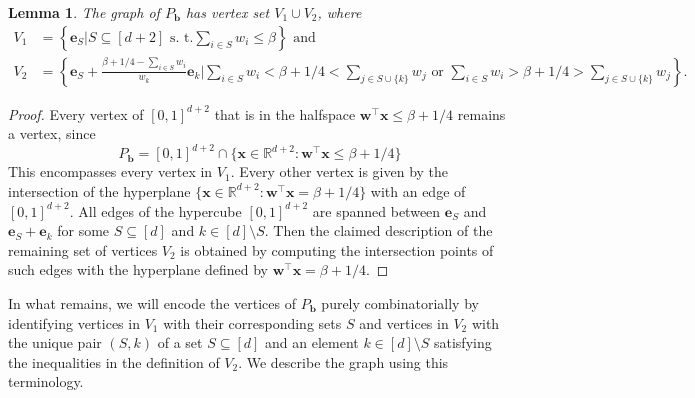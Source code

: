 \documentclass[centering,11pt,reqno]{amsart}
\newtheorem{lem}[theorem]{Lemma}
\theoremstyle{definition}
\begin{document}
\begin{lem}
\label{lem:knapsackvertices}
The graph of $P_{\mathbf{b}}$ has vertex set $V_{1} \cup V_{2}$, where 
\begin{align*}
    V_{1} &= \left\{\mathbf{e}_S\bigg\vert S\subseteq [d+2] \text{ s. t.} \sum_{i \in S} w_{i} \leq \beta\right\} \text{ and} \\
    V_{2} &= \left\{\mathbf{e}_{S} + \frac{\beta+1/4-\sum_{i\in S} w_{i}}{w_{k}} \mathbf{e}_{k}\bigg\vert \sum_{i \in S} w_{i} < \beta + 1/4< \sum_{j \in S \cup \{k\}} w_{j} \text{ or }\sum_{i \in S} w_{i} > \beta + 1/4 > \sum_{j \in S \cup \{k\}} w_{j}\right\}.
\end{align*}
\end{lem}

\begin{proof}
Every vertex of $[0,1]^{d+2}$ that is in the halfspace $\mathbf{w}^{\intercal} \mathbf{x} \leq \beta + 1/4$ remains a vertex, since 
\[P_{\mathbf{b}} = [0,1]^{d+2} \cap  \{\mathbf{x} \in \mathbb{R}^{d+2}: \mathbf{w}^{\intercal} \mathbf{x} \leq \beta + 1/4\}\]
This encompasses every vertex in $V_{1}$. Every other vertex is given by the intersection of the hyperplane $\{\mathbf{x} \in \mathbb{R}^{d+2}: \mathbf{w}^{\intercal} \mathbf{x} = \beta + 1/4\}$ with an edge of $[0,1]^{d+2}$. All edges of the hypercube $[0,1]^{d+2}$ are spanned between $\mathbf{e}_{S}$ and $\mathbf{e}_{S} + \mathbf{e}_{k}$ for some $S \subseteq [d]$ and $k \in [d] \setminus S$. Then the claimed description of the remaining set of vertices $V_{2}$ is obtained by computing the intersection points of such edges with the hyperplane defined by $\mathbf{w}^{\intercal} \mathbf{x} = \beta + 1/4$. 
\end{proof}

In what remains, we will encode the vertices of $P_\mathbf{b}$ purely combinatorially by identifying vertices in $V_1$ with their corresponding sets $S$ and vertices in $V_2$ with the unique pair $(S,k)$ of a set $S\subseteq [d]$ and an element $k\in [d]\setminus S$ satisfying the inequalities in the definition of $V_2$. We describe the graph using this terminology.
\end{document}
